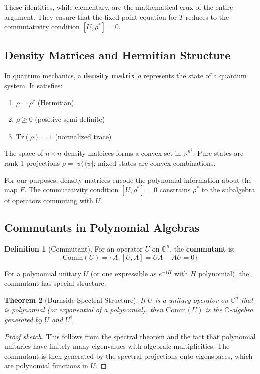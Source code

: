 \documentclass[11pt,a4paper]{article}
\theoremstyle{plain}
\newtheorem{theorem}{Theorem}[section]
\theoremstyle{definition}
\newtheorem{definition}[theorem]{Definition}
\newcommand{\RR}{\mathbb{R}}
\newcommand{\CC}{\mathbb{C}}
\newcommand{\Tr}{\mathrm{Tr}}
\newcommand{\Com}[1]{\mathrm{Comm}(#1)}
\begin{document}
These identities, while elementary, are the mathematical crux of the entire argument. They ensure that the fixed-point equation for $T$ reduces to the commutativity condition $[U, \rho^*] = 0$.

\subsection{Density Matrices and Hermitian Structure}

In quantum mechanics, a \textbf{density matrix} $\rho$ represents the state of a quantum system. It satisfies:
\begin{enumerate}
\item $\rho = \rho^\dagger$ (Hermitian)
\item $\rho \geq 0$ (positive semi-definite)
\item $\Tr(\rho) = 1$ (normalized trace)
\end{enumerate}

The space of $n \times n$ density matrices forms a convex set in $\RR^{n^2}$. Pure states are rank-1 projections $\rho = |\psi\rangle\langle\psi|$; mixed states are convex combinations.

For our purposes, density matrices encode the polynomial information about the map $F$. The commutativity condition $[U, \rho^*] = 0$ constrains $\rho^*$ to the subalgebra of operators commuting with $U$.

\subsection{Commutants in Polynomial Algebras}

\begin{definition}[Commutant]
For an operator $U$ on $\CC^n$, the \textbf{commutant} is:
$$\Com{U} = \{A: [U,A] = UA - AU = 0\}$$
\end{definition}

For a polynomial unitary $U$ (or one expressible as $e^{-iH}$ with $H$ polynomial), the commutant has special structure.

\begin{theorem}[Burnside Spectral Structure]
\label{thm:burnside-polynomial}
If $U$ is a unitary operator on $\CC^n$ that is polynomial (or exponential of a polynomial), then $\Com{U}$ is the $\CC$-algebra generated by $U$ and $U^\dagger$.
\end{theorem}

\begin{proof}[Proof sketch]
This follows from the spectral theorem and the fact that polynomial unitaries have finitely many eigenvalues with algebraic multiplicities. The commutant is then generated by the spectral projections onto eigenspaces, which are polynomial functions in $U$.
\end{proof}
\end{document}

